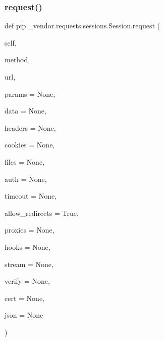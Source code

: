 \subsubsection{\texorpdfstring{request()}{request()}}
{\footnotesize\ttfamily def pip.\+\_\+vendor.\+requests.\+sessions.\+Session.\+request (\begin{DoxyParamCaption}\item[{}]{self,  }\item[{}]{method,  }\item[{}]{url,  }\item[{}]{params = {\ttfamily None},  }\item[{}]{data = {\ttfamily None},  }\item[{}]{headers = {\ttfamily None},  }\item[{}]{cookies = {\ttfamily None},  }\item[{}]{files = {\ttfamily None},  }\item[{}]{auth = {\ttfamily None},  }\item[{}]{timeout = {\ttfamily None},  }\item[{}]{allow\+\_\+redirects = {\ttfamily True},  }\item[{}]{proxies = {\ttfamily None},  }\item[{}]{hooks = {\ttfamily None},  }\item[{}]{stream = {\ttfamily None},  }\item[{}]{verify = {\ttfamily None},  }\item[{}]{cert = {\ttfamily None},  }\item[{}]{json = {\ttfamily None} }\end{DoxyParamCaption})}

